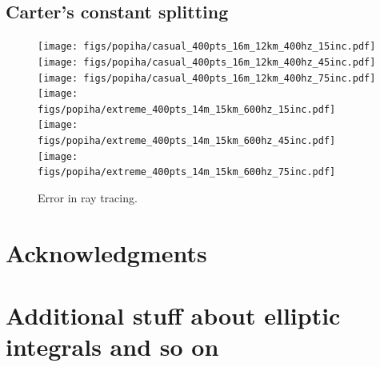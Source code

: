 \documentclass[iop, usenatbib]{emulateapj}
\begin{document}
\subsection{Carter's constant splitting}

\begin{figure}
\centering
\texttt{[image: figs/popiha/casual\_400pts\_16m\_12km\_400hz\_15inc.pdf]}
\texttt{[image: figs/popiha/casual\_400pts\_16m\_12km\_400hz\_45inc.pdf]}
\texttt{[image: figs/popiha/casual\_400pts\_16m\_12km\_400hz\_75inc.pdf]}
\texttt{[image: figs/popiha/extreme\_400pts\_14m\_15km\_600hz\_15inc.pdf]}
\texttt{[image: figs/popiha/extreme\_400pts\_14m\_15km\_600hz\_45inc.pdf]}
\texttt{[image: figs/popiha/extreme\_400pts\_14m\_15km\_600hz\_75inc.pdf]}
\caption{\label{fig:H_C1_C2}
  Error in ray tracing.
  }
\end{figure}







\section*{Acknowledgments}






\clearpage
\appendix

\section{Additional stuff about elliptic integrals and so on}
\end{document}
